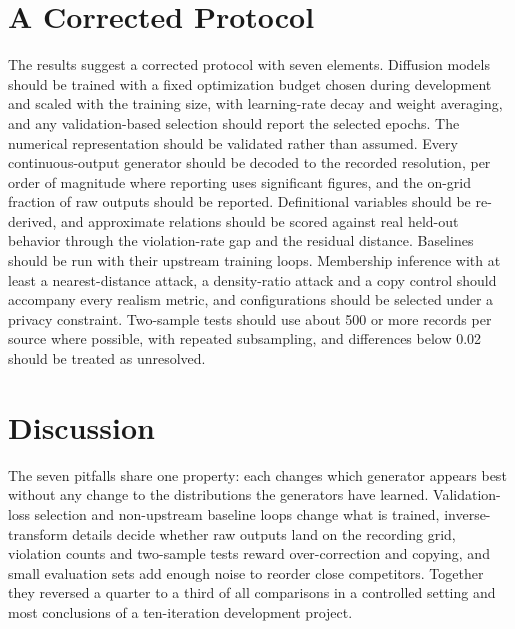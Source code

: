 \documentclass[conference]{IEEEtran}
\begin{document}
\section{A Corrected Protocol}

The results suggest a corrected protocol with seven elements. Diffusion models should be trained with a fixed optimization budget chosen during development and scaled with the training size, with learning-rate decay and weight averaging, and any validation-based selection should report the selected epochs. The numerical representation should be validated rather than assumed. Every continuous-output generator should be decoded to the recorded resolution, per order of magnitude where reporting uses significant figures, and the on-grid fraction of raw outputs should be reported. Definitional variables should be re-derived, and approximate relations should be scored against real held-out behavior through the violation-rate gap and the residual distance. Baselines should be run with their upstream training loops. Membership inference with at least a nearest-distance attack, a density-ratio attack and a copy control should accompany every realism metric, and configurations should be selected under a privacy constraint. Two-sample tests should use about 500 or more records per source where possible, with repeated subsampling, and differences below 0.02 should be treated as unresolved.

\section{Discussion}

The seven pitfalls share one property: each changes which generator appears best without any change to the distributions the generators have learned. Validation-loss selection and non-upstream baseline loops change what is trained, inverse-transform details decide whether raw outputs land on the recording grid, violation counts and two-sample tests reward over-correction and copying, and small evaluation sets add enough noise to reorder close competitors. Together they reversed a quarter to a third of all comparisons in a controlled setting and most conclusions of a ten-iteration development project.
\end{document}
